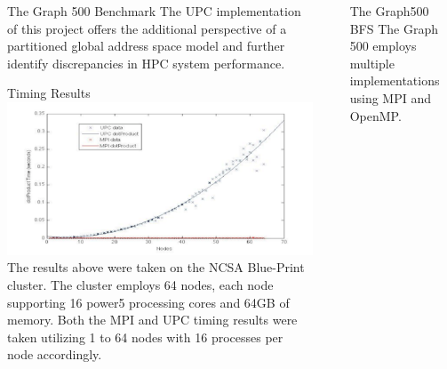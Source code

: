 \documentclass[final]{beamer}
\newlength{\sepwid}
\newlength{\onecolwid}
\newlength{\twocolwid}
\begin{document}
\begin{frame}[t]
\begin{columns}[t]
\begin{column}{\twocolwid}
\begin{block}{The Graph 500 Benchmark}
					The UPC implementation of this project offers the additional perspective of a partitioned global address space model and further identify discrepancies in HPC system performance.
				\end{block}
				\begin{block}{Timing Results}
					\includegraphics[width=\twocolwid, keepaspectratio]{DotProduct.pdf}\\
					The results above were taken on the NCSA Blue-Print cluster.  The cluster employs 64 nodes, each node supporting 16 power5 processing cores and 64GB of memory.  Both the MPI and UPC timing results were taken utilizing 1 to 64 nodes with 16 processes per node accordingly.  
				\end{block}						
			\end{column}	
			\begin{column}{\sepwid}\end{column}			%
			\begin{column}{\onecolwid}
				\begin{block}{The Graph500 BFS}
					The Graph 500 employs multiple implementations using MPI and OpenMP.  
					

\end{block}
\end{column}
\end{columns}
\end{frame}
\end{document}
